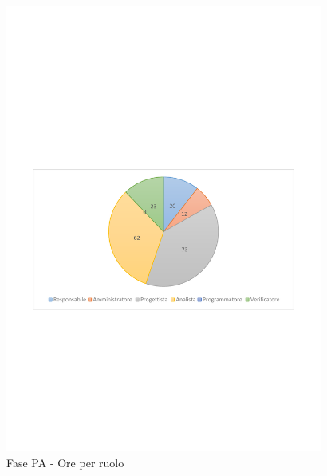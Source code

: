 \documentclass[../PianoProgetto.tex]{subfiles}
\begin{document}
	\begin{figure}[!h]
		\centering
		\includegraphics[width=0.93\textwidth , trim=2cm 9.5cm 2cm 11cm]{grafici/PA/PA-ore-ruolo}
			\caption{Fase PA - Ore per ruolo}
		\label{fig:CircleChart-fasePA_ore_r}
	\end{figure}
\vfill	
\newpage
\vfill
\end{document}

